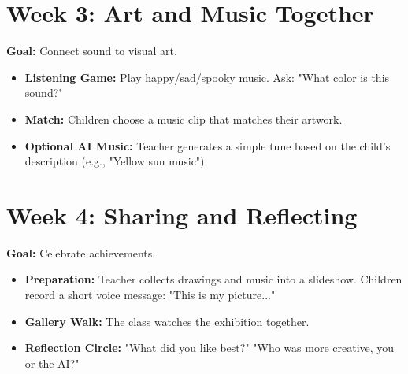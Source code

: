\documentclass[11pt, a4paper]{article}
\begin{document}
\section{Week 3: Art and Music Together}
\textbf{Goal:} Connect sound to visual art.
\begin{itemize}
    \item \textbf{Listening Game:} Play happy/sad/spooky music. Ask: "What color is this sound?"
    \item \textbf{Match:} Children choose a music clip that matches their artwork.
    \item \textbf{Optional AI Music:} Teacher generates a simple tune based on the child's description (e.g., "Yellow sun music").
\end{itemize}

\section{Week 4: Sharing and Reflecting}
\textbf{Goal:} Celebrate achievements.
\begin{itemize}
    \item \textbf{Preparation:} Teacher collects drawings and music into a slideshow. Children record a short voice message: "This is my picture..."
    \item \textbf{Gallery Walk:} The class watches the exhibition together.
    \item \textbf{Reflection Circle:} "What did you like best?" "Who was more creative, you or the AI?"
\end{itemize}
\end{document}
